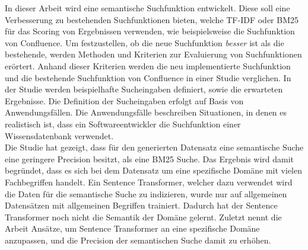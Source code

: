 In dieser Arbeit wird eine semantische Suchfunktion entwickelt.
Diese soll eine Verbesserung zu bestehenden Suchfunktionen bieten, welche TF-IDF oder BM25 für das Scoring von Ergebnissen verwenden, wie beispielsweise die Suchfunktion von Confluence.
Um festzustellen, ob die neue Suchfunktion \textit{besser} ist als die bestehende, werden Methoden und Kriterien zur Evaluierung von Suchfunktionen erörtert.
Anhand dieser Kriterien werden die neu implementierte Suchfunktion und die bestehende Suchfunktion von Confluence in einer Studie verglichen.
In der Studie werden beispielhafte Sucheingaben definiert, sowie die erwarteten Ergebnisse.
Die Definition der Sucheingaben erfolgt auf Basis von Anwendungsfällen.
Die Anwendungsfälle beschreiben Situationen, in denen es realistisch ist, dass ein Softwareentwickler die Suchfunktion einer Wissensdatenbank verwendet.\\

Die Studie hat gezeigt, dass für den generierten Datensatz eine semantische Suche eine geringere Precision besitzt, als eine BM25 Suche.
Das Ergebnis wird damit begründet, dass es sich bei dem Datensatz um eine spezifische Domäne mit vielen Fachbegriffen handelt.
Ein Sentence Transformer, welcher dazu verwendet wird die Daten für die semantische Suche zu indizieren, wurde nur auf allgemeinen Datensätzen mit allgemeinen Begriffen trainiert.
Dadurch hat der Sentence Transformer noch nicht die Semantik der Domäne gelernt.
Zuletzt nennt die Arbeit Ansätze, um Sentence Transformer an eine spezifische Domäne anzupassen, und die Precision der semantischen Suche damit zu erhöhen.